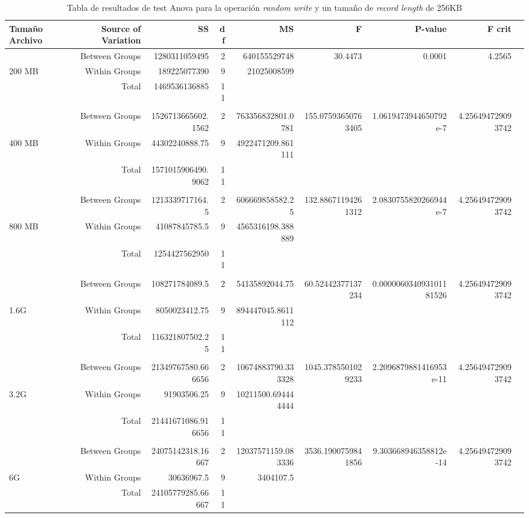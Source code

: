 \begin{landscape}
\begin{table}[!htp]\centering
\caption{Tabla de resultados de test Anova para la operación \textit{random write} y un tamaño de \textit{record length} de 256KB}\label{tab: }
\scriptsize
\begin{tabular}{lrrrrrrrr}\toprule
Tamaño Archivo &Source of Variation &SS &df &MS &F &P-value &F crit \\\midrule
&Between Groups &1280311059495 &2 &640155529748 &30.4473 &0.0001 &4.2565 \\
200 MB &Within Groups &189225077390 &9 &21025008599 & & & \\
&Total &1469536136885 &11 & & & & \\
& & & & & & & \\
&Between Groups &1526713665602.1562 &2 &763356832801.0781 &155.07593650763405 &1.0619473944650792e-7 &4.256494729093742 \\
400 MB &Within Groups &44302240888.75 &9 &4922471209.861111 & & & \\
&Total &1571015906490.9062 &11 & & & & \\
& & & & & & & \\
&Between Groups &1213339717164.5 &2 &606669858582.25 &132.88671194261312 &2.0830755820266944e-7 &4.256494729093742 \\
800 MB &Within Groups &41087845785.5 &9 &4565316198.388889 & & & \\
&Total &1254427562950 &11 & & & & \\
& & & & & & & \\
&Between Groups &108271784089.5 &2 &54135892044.75 &60.52442377137234 &0.000006034093101181526 &4.256494729093742 \\
1.6G &Within Groups &8050023412.75 &9 &894447045.8611112 & & & \\
&Total &116321807502.25 &11 & & & & \\
& & & & & & & \\
&Between Groups &21349767580.666656 &2 &10674883790.333328 &1045.3785501029233 &2.2096879881416953e-11 &4.256494729093742 \\
3.2G &Within Groups &91903506.25 &9 &10211500.694444444 & & & \\
&Total &21441671086.916656 &11 & & & & \\
& & & & & & & \\
&Between Groups &24075142318.16667 &2 &12037571159.083336 &3536.1900759841856 &9.303668946358812e-14 &4.256494729093742 \\
6G &Within Groups &30636967.5 &9 &3404107.5 & & & \\
&Total &24105779285.66667 &11 & & & & \\
\bottomrule
\end{tabular}
\end{table}
\end{landscape}







